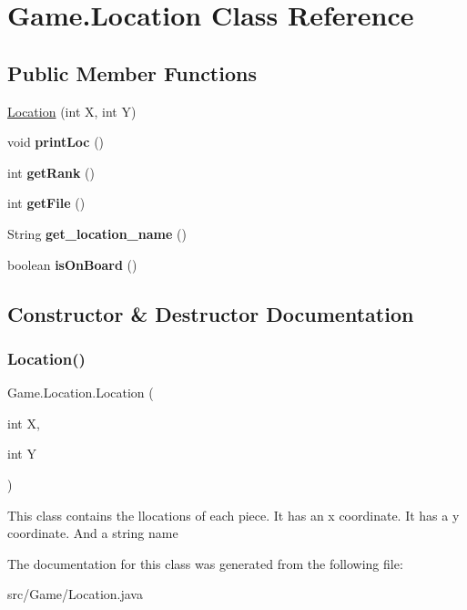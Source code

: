 \hypertarget{class_game_1_1_location}{}\section{Game.\+Location Class Reference}
\label{class_game_1_1_location}
\subsection*{Public Member Functions}
\begin{DoxyCompactItemize}
\item 
\hyperlink{class_game_1_1_location_a2495e651aa5fd0e0ceadd214110c7636}{Location} (int X, int Y)
\item 
\mbox{\label{class_game_1_1_location_a885d1e5e9db3fa1952bd19d3c16cd692}} 
void {\bfseries print\+Loc} ()
\item 
\mbox{\label{class_game_1_1_location_a05a33b631edc58aca142cbfd764cf959}} 
int {\bfseries get\+Rank} ()
\item 
\mbox{\label{class_game_1_1_location_ac1b54da6df376f41b06b53307e5cf42f}} 
int {\bfseries get\+File} ()
\item 
\mbox{\label{class_game_1_1_location_ab714802f95d86395573a9fb6533da284}} 
String {\bfseries get\+\_\+location\+\_\+name} ()
\item 
\mbox{\label{class_game_1_1_location_a199a32db7abcccfd986bb4477f67aa12}} 
boolean {\bfseries is\+On\+Board} ()
\end{DoxyCompactItemize}


\subsection{Constructor \& Destructor Documentation}
\mbox{\label{class_game_1_1_location_a2495e651aa5fd0e0ceadd214110c7636}} 
\subsubsection{\texorpdfstring{Location()}{Location()}}
{\footnotesize\ttfamily Game.\+Location.\+Location (\begin{DoxyParamCaption}\item[{int}]{X,  }\item[{int}]{Y }\end{DoxyParamCaption})\hspace{0.3cm}{\ttfamily [inline]}}

This class contains the llocations of each piece. It has an x coordinate. It has a y coordinate. And a string name 

The documentation for this class was generated from the following file\+:\begin{DoxyCompactItemize}
\item 
src/\+Game/Location.\+java\end{DoxyCompactItemize}
